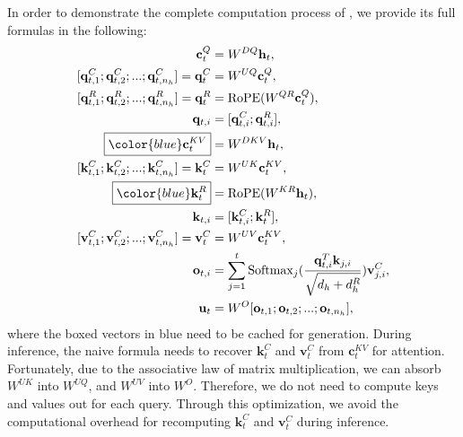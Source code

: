 In order to demonstrate the complete computation process of \dsattn{}, we provide its full formulas in the following: 
\begin{align}
    \mathbf{c}_{t}^{Q} &= W^{DQ} \mathbf{h}_{t}, \\
    [\mathbf{q}_{t, 1}^{C};\mathbf{q}_{t, 2}^{C};...;\mathbf{q}_{t, n_{h}}^{C}] = \mathbf{q}_{t}^{C} &= W^{UQ} \mathbf{c}_{t}^{Q}, \\
    [\mathbf{q}_{t, 1}^{R};\mathbf{q}_{t, 2}^{R};...;\mathbf{q}_{t, n_{h}}^{R}] = \mathbf{q}_{t}^{R} &= \operatorname{RoPE}({W^{QR}} \mathbf{c}_{t}^{Q}), \\
    \mathbf{q}_{t, i} &= [\mathbf{q}_{t, i}^{C}; \mathbf{q}_{t, i}^{R}], \\
    \boxed{\color{blue} \mathbf{c}_{t}^{KV}} &= W^{DKV} \mathbf{h}_{t}, \\
    [\mathbf{k}_{t, 1}^{C};\mathbf{k}_{t, 2}^{C};...;\mathbf{k}_{t, n_{h}}^{C}] = \mathbf{k}_{t}^{C} &= W^{UK} \mathbf{c}_{t}^{KV}, \\
    \boxed{\color{blue}\mathbf{k}_{t}^{R}} &= \operatorname{RoPE}({W^{KR}} \mathbf{h}_{t}), \\
    \mathbf{k}_{t, i} &= [\mathbf{k}_{t, i}^{C}; \mathbf{k}_{t}^{R}], \\
    [\mathbf{v}_{t, 1}^{C};\mathbf{v}_{t, 2}^{C};...;\mathbf{v}_{t, n_{h}}^{C}] = \mathbf{v}_{t}^{C} &= W^{UV} \mathbf{c}_{t}^{KV}, \\
    \mathbf{o}_{t, i} &= \sum_{j=1}^{t} \operatorname{Softmax}_j(\frac{\mathbf{q}_{t, i}^T \mathbf{k}_{j, i}}{\sqrt{d_{h} + d_{h}^{R}}}) \mathbf{v}_{j, i}^{C}, \\
    \mathbf{u}_{t} &= W^{O} [\mathbf{o}_{t, 1};\mathbf{o}_{t, 2};...;\mathbf{o}_{t, n_{h}}],
\end{align}
where the boxed vectors in blue need to be cached for generation. 
During inference, the naive formula needs to recover $\mathbf{k}_{t}^{C}$ and $\mathbf{v}_{t}^{C}$ from $\mathbf{c}_{t}^{KV}$ for attention. 
Fortunately, due to the associative law of matrix multiplication, we can absorb $W^{UK}$ into $W^{UQ}$, and $W^{UV}$ into $W^{O}$. 
Therefore, we do not need to compute keys and values out for each query. 
Through this optimization, we avoid the computational overhead for recomputing $\mathbf{k}_{t}^{C}$ and $\mathbf{v}_{t}^{C}$ during inference. 
